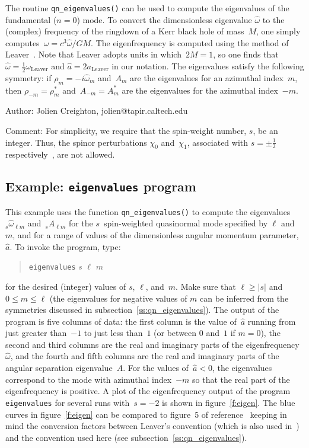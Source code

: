 The routine \texttt{qn\_eigenvalues()} can be used to compute the eigenvalues
of the fundamental ($n=0$) mode.  To convert the dimensionless eigenvalue
$\hat{\omega}$ to the (complex) frequency of the ringdown of a Kerr black
hole of mass~$M$, one simply computes~$\omega=c^3\hat{\omega}/GM$.
The eigenfrequency is computed using the method of Leaver~\cite{leaver:1985}.
Note that Leaver adopts units in which~$2M=1$, so one finds that
$\hat{\omega}=\frac{1}{2}\omega_{\mathrm{\scriptscriptstyle Leaver}}$ and
$\hat{a}=2a_{\mathrm{\scriptscriptstyle Leaver}}$ in our notation.
The eigenvalues satisfy the following symmetry: if $\rho_m=-i\hat{\omega}_m$
and~$A_m$ are the eigenvalues for an azimuthal index~$m$, then
$\rho_{-m}=\rho_m^\ast$ and~$A_{-m}=A_m^\ast$ are the eigenvalues for the
azimuthal index~$-m$.

\begin{description}
\item{Author:} Jolien Creighton, jolien@tapir.caltech.edu
\item{Comment:} For simplicity, we require that the spin-weight
number, $s$, be an integer.  Thus, the spinor perturbations $\chi_0$
and~$\chi_1$, associated with $s=\pm\frac{1}{2}$
respectively~\cite{teukolsky:1973}, are not allowed.
\end{description}


\clearpage
\subsection{Example: \texttt{eigenvalues} program}

This example uses the function \texttt{qn\_eigenvalues()} to compute the
eigenvalues ${}_s\hat{\omega}_{\ell m}$ and~${}_sA_{\ell m}$ for the
$s$~spin-weighted quasinormal mode specified by $\ell$ and~$m$, and for
a range of values of the dimensionless angular momentum parameter, $\hat{a}$.
To invoke the program, type:
\begin{quote}
\texttt{eigenvalues} $s$ $\ell$ $m$
\end{quote}
for the desired (integer) values of $s$, $\ell$, and~$m$.  Make sure that
$\ell\ge|s|$ and~$0\le m\le\ell$ (the eigenvalues for negative values of
$m$ can be inferred from the symmetries discussed in
subsection~\ref{ss:qn_eigenvalues}).  The output of the program is five
columns of data: the first column is the value of~$\hat{a}$ running from just
greater than~$-1$ to just less than~$1$ (or between $0$ and~$1$ if $m=0$),
the second and third columns are the real and imaginary parts of the
eigenfrequency~$\hat{\omega}$, and the fourth and fifth columns are the
real and imaginary parts of the angular separation eigenvalue~$A$.
For the values of~$\hat{a}<0$, the eigenvalues correspond to the mode
with azimuthal index~$-m$ so that the real part of the eigenfrequency is
positive.  A plot of the eigenfrequency output of the program
\texttt{eigenvalues} for several runs with~$s=-2$ is shown in
figure~\ref{f:eigen}.  The blue curves in figure~\ref{f:eigen} can be compared
to figure~5 of reference~\cite{onozawa:1997} keeping in mind the conversion
factors between Leaver's convention (which is also used in~\cite{onozawa:1997})
and the convention used here (see subsection~\ref{ss:qn_eigenvalues}).

